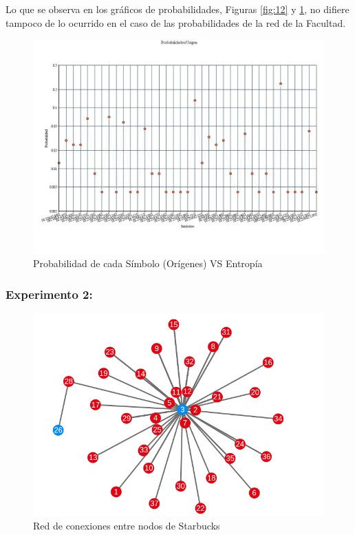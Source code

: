 Lo que se observa en los gráficos de probabilidades, Figuras \ref{fig:12} y \ref{fig:13}, no difiere tampoco de lo ocurrido en el caso de las probabilidades de la red de la Facultad.

\begin{figure}[H]
  \centering
    \includegraphics[scale=0.45]{imagenes/graficos/Probabilidades/04origen.jpg}
  \caption{Probabilidad de cada Símbolo (Orígenes) VS Entropía}
  \label{fig:13}
\end{figure}

\subsubsection{Experimento 2:}

\begin{figure}[H]
  \centering
    \includegraphics[scale=0.45]{imagenes/graficos/grafos/starbucks.png}
  \caption{Red de conexiones entre nodos de Starbucks}
  \label{fig:14}
\end{figure}

